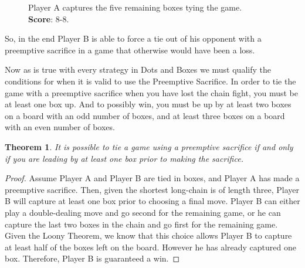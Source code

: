 \documentclass[12pt,twoside]{reedthesis}
\newtheorem{theorem}{Theorem}
\begin{document}
\begin{multicols}{2}
\begin{figure}[H]
\caption{Player A captures the five remaining boxes tying the game. \\\textbf{\textbf{Score}}: 8-8.}
\end{figure}
\end{multicols}

So, in the end Player B is able to force a tie out of his opponent with a preemptive sacrifice in a game that otherwise would have been a loss. 

Now as is true with every strategy in Dots and Boxes we must qualify the conditions for when it is valid to use the Preemptive Sacrifice.  In order to tie the game with a preemptive sacrifice when you have lost the chain fight, you must be at least one box up.  And to possibly win, you must be up by at least two boxes on a board with an odd number of boxes, and at least three boxes on a board with an even number of boxes.

\begin{theorem}
It is possible to tie a game using a preemptive sacrifice if and only if you are leading by at least one box prior to making the sacrifice. 
\end{theorem}

\begin{proof}
Assume Player A and Player B are tied in boxes, and Player A has made a preemptive sacrifice.  Then, given the shortest long-chain is of length three, Player B will capture at least one box prior to choosing a final move.  Player B can either play a double-dealing move and go second for the remaining game, or he can capture the last two boxes in the chain and go first for the remaining game.  Given the Loony Theorem, we know that this choice allows Player B to capture at least half of the boxes left on the board.  However he has already captured one box.  Therefore, Player B is guaranteed a win.
\end{proof}
\end{document}
